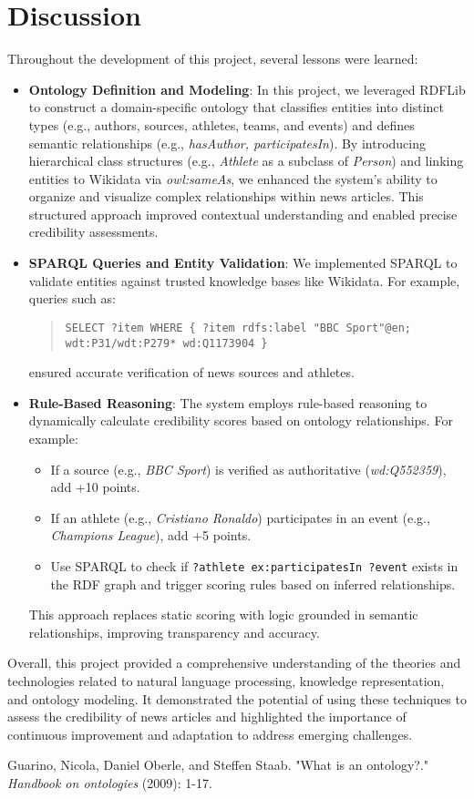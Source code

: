 \documentclass[11pt]{article}
\begin{document}
\section{Discussion}
Throughout the development of this project, several lessons were learned:
\begin{itemize}
    \item \textbf{Ontology Definition and Modeling}: In this project, we leveraged RDFLib to construct a domain-specific ontology that classifies entities into distinct types (e.g., authors, sources, athletes, teams, and events) and defines semantic relationships (e.g., \textit{hasAuthor, participatesIn}). By introducing hierarchical class structures (e.g., \textit{Athlete} as a subclass of \textit{Person}) and linking entities to Wikidata via \textit{owl:sameAs}, we enhanced the system’s ability to organize and visualize complex relationships within news articles. This structured approach improved contextual understanding and enabled precise credibility assessments.
    \item \textbf{SPARQL Queries and Entity Validation}: We implemented SPARQL to validate entities against trusted knowledge bases like Wikidata. For example, queries such as:
    \begin{quote}
    \texttt{SELECT ?item WHERE \{ ?item rdfs:label "BBC Sport"@en; wdt:P31/wdt:P279* wd:Q1173904 \}}
    \end{quote}
    ensured accurate verification of news sources and athletes. 
    \item \textbf{Rule-Based Reasoning}: The system employs rule-based reasoning to dynamically calculate credibility scores based on ontology relationships. For example:
    \begin{itemize}
        \item If a source (e.g., \textit{BBC Sport}) is verified as authoritative (\textit{wd:Q552359}), add +10 points.
        \item If an athlete (e.g., \textit{Cristiano Ronaldo}) participates in an event (e.g., \textit{Champions League}), add +5 points.
        \item Use SPARQL to check if \texttt{?athlete ex:participatesIn ?event} exists in the RDF graph and trigger scoring rules based on inferred relationships.
    \end{itemize}
    This approach replaces static scoring with logic grounded in semantic relationships, improving transparency and accuracy.
\end{itemize}

Overall, this project provided a comprehensive understanding of the theories and technologies related to natural language processing, knowledge representation, and ontology modeling. It demonstrated the potential of using these techniques to assess the credibility of news articles and highlighted the importance of continuous improvement and adaptation to address emerging challenges.

\begin{thebibliography}{99}
Guarino, Nicola, Daniel Oberle, and Steffen Staab. "What is an ontology?." \textit{Handbook on ontologies} (2009): 1-17.
\end{thebibliography}
\end{document}
